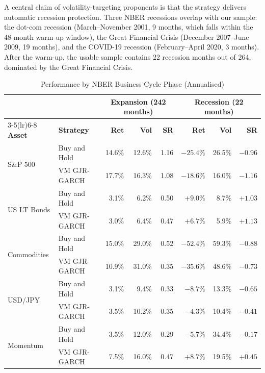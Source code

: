 \documentclass[12pt, a4paper]{article}
\begin{document}
A central claim of volatility-targeting proponents is that the strategy delivers automatic
recession protection. Three NBER recessions overlap with our sample: the dot-com recession
(March--November 2001, 9 months, which falls within the 48-month warm-up window), the
Great Financial Crisis (December 2007--June 2009, 19 months), and the COVID-19 recession
(February--April 2020, 3 months). After the warm-up, the usable sample contains 22
recession months out of 264, dominated by the Great Financial Crisis.

\begin{table}[H]
\centering
\footnotesize
\caption{Performance by NBER Business Cycle Phase (Annualised)}
\label{tab:nber}
\begin{tabular}{llrrrrrr}
\toprule
& & \multicolumn{3}{c}{\textbf{Expansion (242 months)}} & \multicolumn{3}{c}{\textbf{Recession (22 months)}}\\
\cmidrule(lr){3-5}\cmidrule(lr){6-8}
\textbf{Asset} & \textbf{Strategy} & \textbf{Ret} & \textbf{Vol} & \textbf{SR} & \textbf{Ret} & \textbf{Vol} & \textbf{SR}\\
\midrule
\multirow{2}{*}{S\&P 500}     & Buy and Hold   & 14.6\% & 12.6\% & 1.16  & $-25.4\%$ & 26.5\% & $-0.96$\\
                              & VM GJR-GARCH   & 17.7\% & 16.3\% & 1.08  & $-18.6\%$ & 16.0\% & $-1.16$\\
\multirow{2}{*}{US LT Bonds}  & Buy and Hold   &  3.1\% &  6.2\% & 0.50  & $+9.0\%$  &  8.7\% & $+1.03$\\
                              & VM GJR-GARCH   &  3.0\% &  6.4\% & 0.47  & $+6.7\%$  &  5.9\% & $+1.13$\\
\multirow{2}{*}{Commodities}  & Buy and Hold   & 15.0\% & 29.0\% & 0.52  & $-52.4\%$ & 59.3\% & $-0.88$\\
                              & VM GJR-GARCH   & 10.9\% & 31.0\% & 0.35  & $-35.6\%$ & 48.6\% & $-0.73$\\
\multirow{2}{*}{USD/JPY}      & Buy and Hold   &  3.1\% &  9.4\% & 0.33  & $-8.7\%$  & 13.3\% & $-0.65$\\
                              & VM GJR-GARCH   &  3.5\% & 10.2\% & 0.35  & $-4.3\%$  & 10.4\% & $-0.41$\\
\multirow{2}{*}{Momentum}     & Buy and Hold   &  3.5\% & 12.0\% & 0.29  & $-5.7\%$  & 34.4\% & $-0.17$\\
                              & VM GJR-GARCH   &  7.5\% & 16.0\% & 0.47  & $+8.7\%$  & 19.5\% & $+0.45$\\
\bottomrule
\end{tabular}
\end{table}
\end{document}

